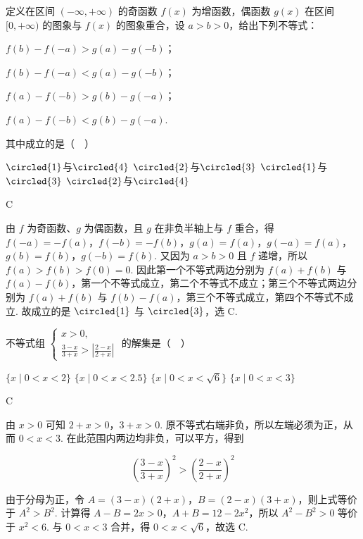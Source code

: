 \documentclass[UTF8,a4paper,oneside,11pt]{ctexbook}
\begin{document}
\begin{problem}
定义在区间 \((-\infty, +\infty)\) 的奇函数 \(f(x)\) 为增函数，偶函数 \(g(x)\) 在区间 \([0, +\infty)\) 的图象与 \(f(x)\) 的图象重合，设 \(a > b > 0\)，给出下列不等式：

\begin{circlelist}
\item \(f(b)-f(-a)>g(a)-g(-b)\)；
\item \(f(b)-f(-a)<g(a)-g(-b)\)；
\item \(f(a)-f(-b)>g(b)-g(-a)\)；
\item \(f(a)-f(-b)<g(b)-g(-a)\).
\end{circlelist}

其中成立的是（\(\quad\)）

\choices
    {\(\circled{1}\)与\(\circled{4}\)}
    {\(\circled{2}\)与\(\circled{3}\)}
    {\(\circled{1}\)与\(\circled{3}\)}
    {\(\circled{2}\)与\(\circled{4}\)}
\end{problem}

\begin{answer}
C
\end{answer}

\begin{solution}
由 \(f\) 为奇函数、\(g\) 为偶函数，且 \(g\) 在非负半轴上与 \(f\) 重合，得 \(f(-a)=-f(a)\)，\(f(-b)=-f(b)\)，\(g(a)=f(a)\)，\(g(-a)=f(a)\)，\(g(b)=f(b)\)，\(g(-b)=f(b)\). 又因为 \(a>b>0\) 且 \(f\) 递增，所以 \(f(a)>f(b)>f(0)=0\). 因此第一个不等式两边分别为 \(f(a)+f(b)\) 与 \(f(a)-f(b)\)，第一个不等式成立，第二个不等式不成立；第三个不等式两边分别为 \(f(a)+f(b)\) 与 \(f(b)-f(a)\)，第三个不等式成立，第四个不等式不成立. 故成立的是 \(\circled{1}\) 与 \(\circled{3}\)，选 C.
\end{solution}

\begin{problem}
不等式组 \(\begin{cases}
x>0,\\
\frac{3-x}{3+x} > \left|\frac{2-x}{2+x}\right|
\end{cases}\) 的解集是（\(\quad\)）

\choices
    {\(\{x \mid 0 < x < 2\}\)}
    {\(\{x \mid 0 < x < 2.5\}\)}
    {\(\{x \mid 0 < x < \sqrt{6}\}\)}
    {\(\{x \mid 0 < x < 3\}\)}
\end{problem}

\begin{answer}
C
\end{answer}

\begin{solution}
由 \(x>0\) 可知 \(2+x>0\)，\(3+x>0\). 原不等式右端非负，所以左端必须为正，从而 \(0<x<3\). 在此范围内两边均非负，可以平方，得到

\[
\left(\frac{3-x}{3+x}\right)^{2}>\left(\frac{2-x}{2+x}\right)^{2}
\]

由于分母为正，令 \(A=(3-x)(2+x)\)，\(B=(2-x)(3+x)\)，则上式等价于 \(A^{2}>B^{2}\). 计算得 \(A-B=2x>0\)，\(A+B=12-2x^{2}\)，所以 \(A^{2}-B^{2}>0\) 等价于 \(x^{2}<6\). 与 \(0<x<3\) 合并，得 \(0<x<\sqrt{6}\)，故选 C.
\end{solution}
\end{document}
